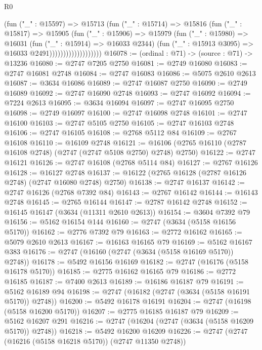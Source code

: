 \begin{lexlean}{R0}
\begin{coremodule}
                              (fun ("_" : @15597) =>
                              @15713
                                (fun ("_" : @15714) =>
                                @15816
                                  (fun ("_" : @15817) =>
                                  @15905
                                    (fun ("_" : @15906) =>
                                    @15979
                                      (fun ("_" : @15980) =>
                                      @16031
                                        (fun ("_" : @15914) => @16033 @2344)
                                        (fun ("_" : @15913 @3095) => @16033 @2491)))))))))))))))))))
@16078 := (ordinal : @71) -> (source : @71) -> @13236
@16080 := @2747 @7205 @2750
@16081 := @2749 @16080
@16083 := @2747 @16081 @2748
@16084 := @2747 @16083
@16086 := @5075 @2610 @2613
@16087 := @3634 @16086
@16089 := @2747 @16087 @2750
@16090 := @2749 @16089
@16092 := @2747 @16090 @2748
@16093 := @2747 @16092
@16094 := @7224 @2613
@16095 := @3634 @16094
@16097 := @2747 @16095 @2750
@16098 := @2749 @16097
@16100 := @2747 @16098 @2748
@16101 := @2747 @16100
@16103 := @2747 @5105 @2750
@16105 := @2747 @16103 @2748
@16106 := @2747 @16105
@16108 := @2768 @5112 @84
@16109 := @2767 @16108
@16110 := @16109 @2748
@16121 := @16106 (@2765 @16110 (@2787 @16108 @2748) (@2747 (@2747 @5108 @2750) @2748) @2750)
@16122 := @2747 @16121
@16126 := @2747 @16108 (@2768 @5114 @84)
@16127 := @2767 @16126
@16128 := @16127 @2748
@16137 := @16122 (@2765 @16128 (@2787 @16126 @2748) (@2747 @16080 @2748) @2750)
@16138 := @2747 @16137
@16142 := @2747 @16126 (@2768 @7392 @84)
@16143 := @2767 @16142
@16144 := @16143 @2748
@16145 := @2765 @16144
@16147 := @2787 @16142 @2748
@16152 := @16145 @16147 (@3634 (@11311 @2610 @2613))
@16154 := @3604 @7392 @79
@16156 := @5162 @16154 @144
@16160 := @2747 (@3634 (@5158 @16156 @5170))
@16162 := @2776 @7392 @79
@16163 := @2772 @16162
@16165 := @5079 @2610 @2613
@16167 := @16163 @16165 @79
@16169 := @5162 @16167 @383
@16176 := @2747 (@16160 (@2747 (@3634 (@5158 @16169 @5170)) @2748))
@16178 := @5492 @16156 @16169
@16182 := @2747 (@16176 (@5158 @16178 @5170))
@16185 := @2775 @16162 @16165 @79
@16186 := @2772 @16185
@16187 := @7400 @2613
@16189 := @16186 @16187 @79
@16191 := @5162 @16189 @94
@16198 := @2747 (@16182 (@2747 (@3634 (@5158 @16191 @5170)) @2748))
@16200 := @5492 @16178 @16191
@16204 := @2747 (@16198 (@5158 @16200 @5170))
@16207 := @2775 @16185 @16187 @79
@16209 := @5162 @16207 @291
@16216 := @2747 (@16204 (@2747 (@3634 (@5158 @16209 @5170)) @2748))
@16218 := @5492 @16200 @16209
@16226 := @2747 (@2747 (@16216 (@5158 @16218 @5170)) (@2747 @11350 @2748))

\end{coremodule}
\end{lexlean}
